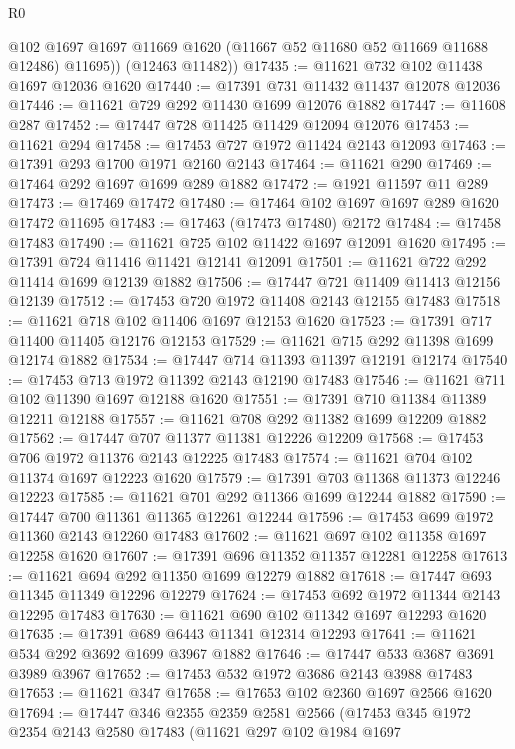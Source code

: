 \begin{lexlean}{R0}
\begin{coremodule}
          @102
          @1697
          @1697
          @11669
          @1620
          (@11667 @52 @11680 @52 @11669 @11688 @12486)
          @11695))
      (@12463 @11482))
@17435 := @11621 @732 @102 @11438 @1697 @12036 @1620
@17440 := @17391 @731 @11432 @11437 @12078 @12036
@17446 := @11621 @729 @292 @11430 @1699 @12076 @1882
@17447 := @11608 @287
@17452 := @17447 @728 @11425 @11429 @12094 @12076
@17453 := @11621 @294
@17458 := @17453 @727 @1972 @11424 @2143 @12093
@17463 := @17391 @293 @1700 @1971 @2160 @2143
@17464 := @11621 @290
@17469 := @17464 @292 @1697 @1699 @289 @1882
@17472 := @1921 @11597 @11 @289
@17473 := @17469 @17472
@17480 := @17464 @102 @1697 @1697 @289 @1620 @17472 @11695
@17483 := @17463 (@17473 @17480) @2172
@17484 := @17458 @17483
@17490 := @11621 @725 @102 @11422 @1697 @12091 @1620
@17495 := @17391 @724 @11416 @11421 @12141 @12091
@17501 := @11621 @722 @292 @11414 @1699 @12139 @1882
@17506 := @17447 @721 @11409 @11413 @12156 @12139
@17512 := @17453 @720 @1972 @11408 @2143 @12155 @17483
@17518 := @11621 @718 @102 @11406 @1697 @12153 @1620
@17523 := @17391 @717 @11400 @11405 @12176 @12153
@17529 := @11621 @715 @292 @11398 @1699 @12174 @1882
@17534 := @17447 @714 @11393 @11397 @12191 @12174
@17540 := @17453 @713 @1972 @11392 @2143 @12190 @17483
@17546 := @11621 @711 @102 @11390 @1697 @12188 @1620
@17551 := @17391 @710 @11384 @11389 @12211 @12188
@17557 := @11621 @708 @292 @11382 @1699 @12209 @1882
@17562 := @17447 @707 @11377 @11381 @12226 @12209
@17568 := @17453 @706 @1972 @11376 @2143 @12225 @17483
@17574 := @11621 @704 @102 @11374 @1697 @12223 @1620
@17579 := @17391 @703 @11368 @11373 @12246 @12223
@17585 := @11621 @701 @292 @11366 @1699 @12244 @1882
@17590 := @17447 @700 @11361 @11365 @12261 @12244
@17596 := @17453 @699 @1972 @11360 @2143 @12260 @17483
@17602 := @11621 @697 @102 @11358 @1697 @12258 @1620
@17607 := @17391 @696 @11352 @11357 @12281 @12258
@17613 := @11621 @694 @292 @11350 @1699 @12279 @1882
@17618 := @17447 @693 @11345 @11349 @12296 @12279
@17624 := @17453 @692 @1972 @11344 @2143 @12295 @17483
@17630 := @11621 @690 @102 @11342 @1697 @12293 @1620
@17635 := @17391 @689 @6443 @11341 @12314 @12293
@17641 := @11621 @534 @292 @3692 @1699 @3967 @1882
@17646 := @17447 @533 @3687 @3691 @3989 @3967
@17652 := @17453 @532 @1972 @3686 @2143 @3988 @17483
@17653 := @11621 @347
@17658 := @17653 @102 @2360 @1697 @2566 @1620
@17694 := @17447
    @346
    @2355
    @2359
    @2581
    @2566
    (@17453
      @345
      @1972
      @2354
      @2143
      @2580
      @17483
      (@11621
        @297
        @102
        @1984
        @1697

\end{coremodule}
\end{lexlean}

